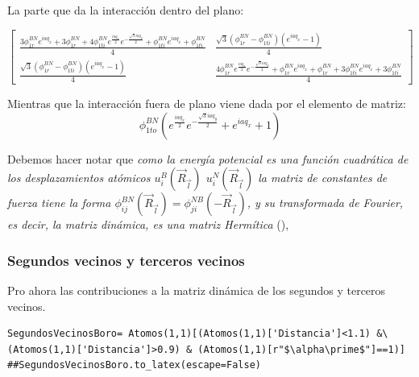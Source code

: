 \documentclass[12pt,a4paper]{article}
\begin{document}
La parte que da la interacción dentro del plano:

\begin{equation}
\label{eq:10}
\left[\begin{matrix}\frac{3 \phi^{BN}_{1r} e^{i a q_{x}} + 3 \phi^{BN}_{1r} + 4 \phi^{BN}_{1ti} e^{\frac{i a q_{x}}{2}} e^{- \frac{\sqrt{3} i a q_{y}}{2}} + \phi^{BN}_{1ti} e^{i a q_{x}} + \phi^{BN}_{1ti}}{4} & \frac{\sqrt{3} \left(\phi^{BN}_{1r} - \phi^{BN}_{1ti}\right) \left(e^{i a q_{x}} - 1\right)}{4}\\\frac{\sqrt{3} \left(\phi^{BN}_{1r} - \phi^{BN}_{1ti}\right) \left(e^{i a q_{x}} - 1\right)}{4} & \frac{4 \phi^{BN}_{1r} e^{\frac{i a q_{x}}{2}} e^{- \frac{\sqrt{3} i a q_{y}}{2}} + \phi^{BN}_{1r} e^{i a q_{x}} + \phi^{BN}_{1r} + 3 \phi^{BN}_{1ti} e^{i a q_{x}} + 3 \phi^{BN}_{1ti}}{4}\end{matrix}\right]
\end{equation}

Mientras que la interacción fuera de plano viene dada por el elemento de matriz:
\begin{equation}
\label{eq:12}
\phi^{BN}_{1to} \left(e^{\frac{i a q_{x}}{2}} e^{- \frac{\sqrt{3} i a q_{y}}{2}} + e^{i a q_{x}} + 1\right)
\end{equation}


Debemos hacer notar que \emph{como la energía potencial es una función cuadrática de los desplazamientos atómicos \(u^B_i(\vec R_{\vec l})\) \(u^N_i(\vec R_{\vec l})\) la matriz de constantes de fuerza tiene la forma \(\phi_{ij}^{BN}(\vec R_{\vec l})=\phi_{ji}^{NB}(-\vec R_{\vec l})\), y su transformada de Fourier, es decir, la matriz dinámica, es una matriz Hermítica} (\cite{falkovsky08_symmet_const_phonon_disper_graph}), 

\newpage
\eject \pdfpagewidth=210mm \pdfpageheight=297mm

\subsubsection{Segundos vecinos y terceros vecinos}
\label{sec:org3e77356}

Pro ahora las contribuciones a la matriz dinámica de los segundos y terceros vecinos.

\begin{verbatim}
SegundosVecinosBoro= Atomos(1,1)[(Atomos(1,1)['Distancia']<1.1) &\
(Atomos(1,1)['Distancia']>0.9) & (Atomos(1,1)[r"$\alpha\prime$"]==1)]
##SegundosVecinosBoro.to_latex(escape=False)
\end{verbatim}
\end{document}
